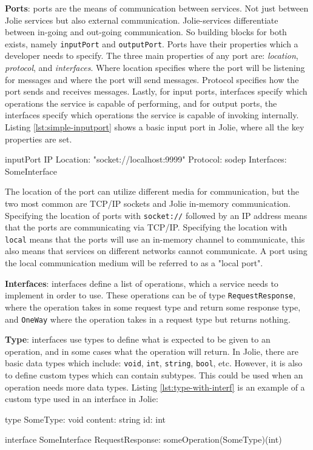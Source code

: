 \textbf{Ports}: ports are the means of communication between services. Not just between Jolie services but also external communication.
Jolie-services differentiate between in-going and out-going communication. So building blocks for both exists, namely \texttt{inputPort} and \texttt{outputPort}.
Ports have their properties which a developer needs to specify. The three main properties of any port are: \textit{location}, \textit{protocol}, and \textit{interfaces}.
Where location specifies where the port will be listening for messages and where the port will send messages.
Protocol specifies how the port sends and receives messages. Lastly, for input ports, interfaces specify which
operations the service is capable of performing, and for output ports, the interfaces specify which
operations the service is capable of invoking internally. Listing \ref*{lst:simple-inputport} shows a basic input port in Jolie, where all the key properties are set.

\begin{jolisting}[][caption={Simple input port in Jolie},label=lst:simple-inputport]
inputPort IP {
    Location: "socket://localhost:9999"
    Protocol: sodep
    Interfaces: SomeInterface
}
\end{jolisting}

The location of the port can utilize different media for communication, but the two most common are TCP/IP sockets and Jolie in-memory communication.
Specifying the location of ports with \texttt{socket://} followed by an IP address means that the ports are communicating via TCP/IP.
Specifying the location with \texttt{local} means that the ports will use an in-memory channel to communicate, this also means that services on different networks cannot communicate.
A port using the local communication medium will be referred to as a "local port".

\textbf{Interfaces}: interfaces define a list of operations, which a service needs to implement in order to use. These operations can be of type \texttt{RequestResponse}, where the operation takes in some request type and return some response type, 
and \texttt{OneWay} where the operation takes in a request type but returns nothing.

\textbf{Type}: interfaces use types to define what is expected to be given to an operation, and in some cases what the operation will return. In Jolie, there are basic
data types which include: \texttt{void}, \texttt{int}, \texttt{string}, \texttt{bool}, etc. However, it is also to define custom types which can contain subtypes. 
This could be used when an operation needs more data types.
Listing \ref*{lst:type-with-interf} is an example of a custom type used in an interface in Jolie:
\begin{jolisting}[][caption={Custom type used in an interface in Jolie},label=lst:type-with-interf]
type SomeType: void {
    content: string
    id: int
}

interface SomeInterface {
    RequestResponse:
        someOperation(SomeType)(int)
}
\end{jolisting}

